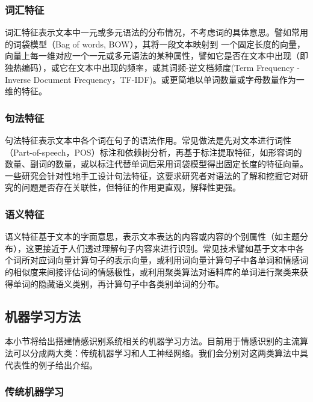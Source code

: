 \subsubsection{词汇特征} %

词汇特征表示文本中一元或多元语法的分布情况，不考虑词的具体意思。譬如常用的词袋模型（Bag of words, BOW），其将一段文本映射到 一个固定长度的向量，向量上每一维对应一个一元或多元语法的某种属性，譬如它是否在文本中出现（即独热编码），或它在文本中出现的频率，或其词频-逆文档频度(Term Frequency - Inverse Document Frequency，TF-IDF)。或更简地以单词数量或字母数量作为一维的特征。

\subsubsection{句法特征} %

句法特征表示文本中各个词在句子的语法作用。常见做法是先对文本进行词性（Part-of-speech，POS）标注和依赖树分析，再基于标注提取特征，如形容词的数量、副词的数量，或以标注代替单词后采用词袋模型得出固定长度的特征向量。一些研究会针对性地手工设计句法特征，这要求研究者对语法的了解和挖掘它对研究的问题是否存在关联性，但特征的作用更直观，解释性更强。

\subsubsection{语义特征} %

语义特征基于文本的字面意思，表示文本表达的内容或内容的个别属性‌（如主题分布），这更接近于人们透过理解句子内容来进行识别。常见技术譬如基于文本中各个词所对应词向量计算句子的表示向量，或利用词向量计算句子中各单词和情感词的相似度来间接评估词的情感极性，或利用聚类算法对语料库的单词进行聚类来获得单词的隐藏语义类别，再计算句子中各类别单词的分布。

\subsection{机器学习方法}
\label{ssec:model}

本小节将给出搭建情感识别系统相关的机器学习方法。目前用于情感识别的主流算法可以分成两大类：传统机器学习和人工神经网络。我们会分别对这两类算法中具代表性的例子给出介绍。

\subsubsection{传统机器学习}

